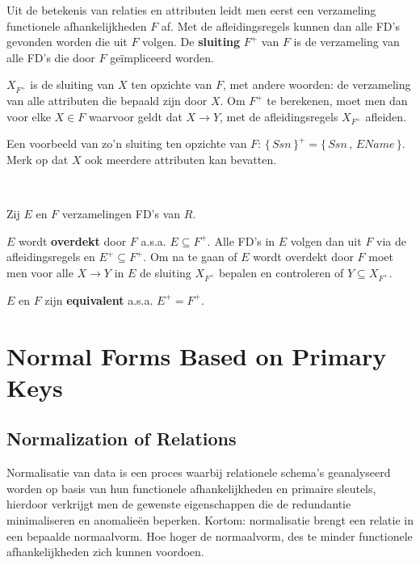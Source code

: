 \noindent Uit de betekenis van relaties en attributen leidt men eerst een verzameling functionele afhankelijkheden $F$ af. Met de afleidingsregels kunnen dan alle FD's gevonden worden die uit $F$ volgen. De \textbf{sluiting} $F^+$ van $F$ is de verzameling van alle FD's die door $F$ ge\"impliceerd worden.

$X_{F^+}$ is de sluiting van $X$ ten opzichte van $F$, met andere woorden: de verzameling van alle attributen die bepaald zijn door $X$. Om $F^+$ te berekenen, moet men dan voor elke $X \in F$ waarvoor geldt dat $X \rightarrow Y$, met de afleidingsregels $X_{F^+}$ afleiden.

Een voorbeeld van zo'n sluiting ten opzichte van $F$: $\{\, \textit{Ssn} \,\}^+ = \{\, \textit{Ssn} \,,\, \textit{EName} \,\}$. Merk op dat $X$ ook meerdere attributen kan bevatten.

~				

\noindent Zij $E$ en $F$ verzamelingen FD's van $R$.

$E$ wordt \textbf{overdekt} door $F$ a.s.a. $E \subseteq F^+$. Alle FD's in $E$ volgen dan uit $F$ via de afleidingsregels en $E^+ \subseteq F^+$. Om na te gaan of $E$ wordt overdekt door $F$ moet men voor alle $X \rightarrow Y$ in $E$ de sluiting $X_{F^+}$ bepalen en controleren of $Y \subseteq X_{F^+}$.

$E$ en $F$ zijn \textbf{equivalent} a.s.a. $E^+ = F^+$.



\section{Normal Forms Based on Primary Keys}
\subsection{Normalization of Relations}
Normalisatie van data is een proces waarbij relationele schema's geanalyseerd worden op basis van hun functionele afhankelijkheden en primaire sleutels, hierdoor verkrijgt men de gewenste eigenschappen die de redundantie minimaliseren en anomalie\"en beperken. Kortom: normalisatie brengt een relatie in een bepaalde normaalvorm. Hoe hoger de normaalvorm, des te minder functionele afhankelijkheden zich kunnen voordoen.


